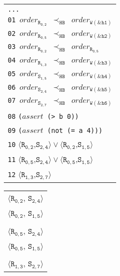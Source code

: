 \newsavebox{\boxSMTc}
\begin{lrbox}{\boxSMTc}
\normalsize
\begin{tabular}[t]{l}
\texttt{...} \\
\texttt{01 $\mathit{order_\mathtt{R_{0,2}}}$ $\mathtt{\prec_\mathtt{HB}}$ $\mathit{order_\mathtt{W(\&h1)}}$}\\
\texttt{02 $\mathit{order_\mathtt{R_{0,5}}}$ $\mathtt{\prec_\mathtt{HB}}$ $\mathit{order_\mathtt{W(\&h2)}}$}\\
\texttt{03 $\mathit{order_\mathtt{R_{0,2}}}$ $\mathtt{\prec_\mathtt{HB}}$ $\mathit{order_\mathtt{R_{0,5}}}$}\\
\texttt{04 $\mathit{order_\mathtt{R_{1,3}}}$ $\mathtt{\prec_\mathtt{HB}}$ $\mathit{order_\mathtt{W(\&h3)}}$}\\
\texttt{05 $\mathit{order_\mathtt{S_{1,5}}}$ $\mathtt{\prec_\mathtt{HB}}$ $\mathit{order_\mathtt{W(\&h4)}}$}\\
\texttt{06 $\mathit{order_\mathtt{S_{2,4}}}$ $\mathtt{\prec_\mathtt{HB}}$ $\mathit{order_\mathtt{W(\&h5)}}$}\\
\texttt{07 $\mathit{order_\mathtt{S_{2,7}}}$ $\mathtt{\prec_\mathtt{HB}}$ $\mathit{order_\mathtt{W(\&h6)}}$}\\
\texttt{08} \texttt{($\mathit{assert}$ (> b 0))}\\
\texttt{09} \texttt{($\mathit{assert}$ (not (= a 4)))}\\
\texttt{10} $\langle\mathtt{R_{0,2}}$,$\mathtt{S_{2,4}}\rangle\vee\langle\mathtt{R_{0,2}}$,$\mathtt{S_{1,5}}\rangle$\\
\texttt{11} $\langle\mathtt{R_{0,5}}$,$\mathtt{S_{2,4}}\rangle\vee\langle\mathtt{R_{0,5}}$,$\mathtt{S_{1,5}}\rangle$\\
\texttt{12} $\langle\mathtt{R_{1,3}}$,$\mathtt{S_{2,7}}\rangle$
\end{tabular}
\end{lrbox}

\newsavebox{\boxMP}
\begin{lrbox}{\boxMP}
\normalsize
\begin{tabular}[t]{l}
$\langle\mathtt{R_{0,2}}$, $\mathtt{S_{2,4}}\rangle$\\
$\langle\mathtt{R_{0,2}}$, $\mathtt{S_{1,5}}\rangle$\\
\\
$\langle\mathtt{R_{0,5}}$, $\mathtt{S_{2,4}}\rangle$\\
$\langle\mathtt{R_{0,5}}$, $\mathtt{S_{1,5}}\rangle$\\
\\
$\langle\mathtt{R_{1,3}}$, $\mathtt{S_{2,7}}\rangle$\\
\end{tabular}
\end{lrbox}


